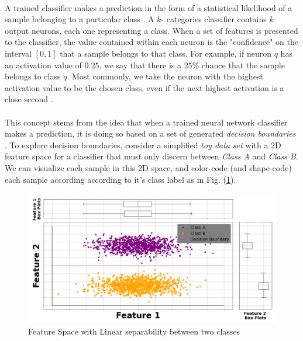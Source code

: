 \documentclass[12pt,letterpaper]{article}
\begin{document}
\paragraph*{}A trained classifier makes a prediction in the form of a statistical likelihood of a sample belonging to a particular class \cite{Goodfellow,James}. A $k$- categories classifier contains $k$ output neurons, each one representing a class. When a set of features is presented to the classifier, the value contained within each neuron is the "confidence" on the interval $[0,1]$ that a sample belongs to that class. For example, if neuron $q$ has an activation value of $0.25$, we say that there is a $25\%$ chance that the sample belongs to class $q$. Most commonly, we take the neuron with the highest activation value to be the chosen class, even if the next highest activation is a close second \cite{Loy}. 

\paragraph*{}This concept stems from the idea that when a trained neural network classifier makes a prediction, it is doing so based on a set of generated \textit{decision boundaries} \cite{Geron,James}. To explore decision boundaries, consider a simplified \textit{toy data set} with a 2D feature space for a classifier that must only discern between \textit{Class A} and \textit{Class B}. We can visualize each sample in this 2D space, and color-code (and shape-code) each sample according according to it's class label as in Fig. (\ref{fig-LinSep1}).

\begin{figure}[H]
\begin{center}
\includegraphics[scale=0.35]{../MakeFigures/LinearSeparable1}
\end{center}
\caption{Feature Space with Linear separability between two classes}
\label{fig-LinSep1}
\end{figure} 
\end{document}
